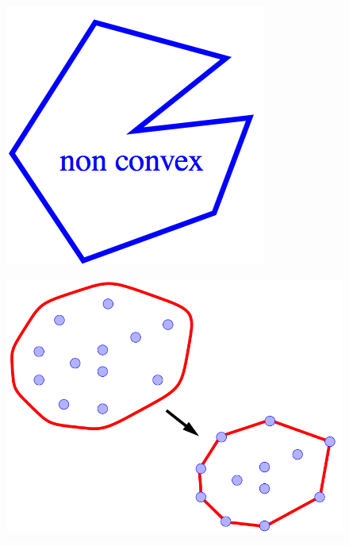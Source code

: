\documentclass[notheorems,serif,table,compress]{beamer}  %
\begin{document}
\begin{frame}
\begin{columns}
\begin{column}{0.6\linewidth}
\begin{tcolorbox}[colback=red!5,colframe=blue!75!black]
\begin{figure}
\begin{minipage}[t]{0.3\linewidth}
              \includegraphics[width=1.1\linewidth]{hull2}
              \end{minipage}
            \end{figure}
            \begin{figure}
              \centering
              \includegraphics[width=0.6\linewidth]{hull} 
            \end{figure}
            \end{tcolorbox}
          \end{column}
    \end{columns}\vspace{1ex}
\end{frame}
\end{document}
